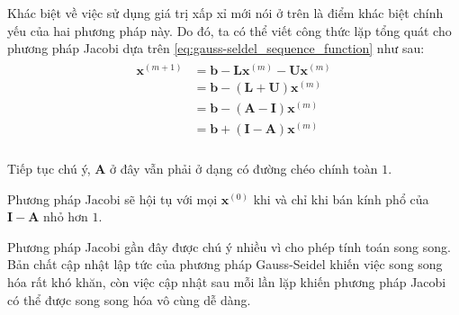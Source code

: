 \documentclass[../../Lectures]{subfiles}
\begin{document}
Khác biệt về việc sử dụng giá trị xấp xỉ mới nói ở trên là điểm khác biệt chính
yếu của hai phương pháp này. Do đó, ta có thể viết công thức lặp tổng quát cho
phương pháp Jacobi dựa trên \eqref{eq:gauss-seldel_sequence_function} như sau:
\begin{align}
    \begin{aligned}
        \bm{x}^{(m + 1)} &= \bm{b} - \bm{L} \bm{x}^{(m)} - \bm{U} \bm{x}^{(m)} \\
                         &= \bm{b} - (\bm{L} + \bm{U}) \bm{x}^{(m)} \\
                         &= \bm{b} - (\bm{A} - \bm{I}) \bm{x}^{(m)} \\
                         &= \bm{b} + (\bm{I} - \bm{A}) \bm{x}^{(m)} \\
    \end{aligned}
\end{align}

Tiếp tục chú ý, \(\bm{A}\) ở đây vẫn phải ở dạng có đường chéo chính toàn \(1\).

Phương pháp Jacobi sẽ hội tụ với mọi \(\bm{x}^{(0)}\) khi và chỉ khi bán kính
phổ của \(\bm{I} - \bm{A}\) nhỏ hơn \(1\).

Phương pháp Jacobi gần đây được chú ý nhiều vì cho phép tính toán song song. Bản
chất cập nhật lập tức của phương pháp Gauss-Seidel khiến việc song song hóa rất
khó khăn, còn việc cập nhật sau mỗi lần lặp khiến phương pháp Jacobi có thể được
song song hóa vô cùng dễ dàng.
\end{document}
